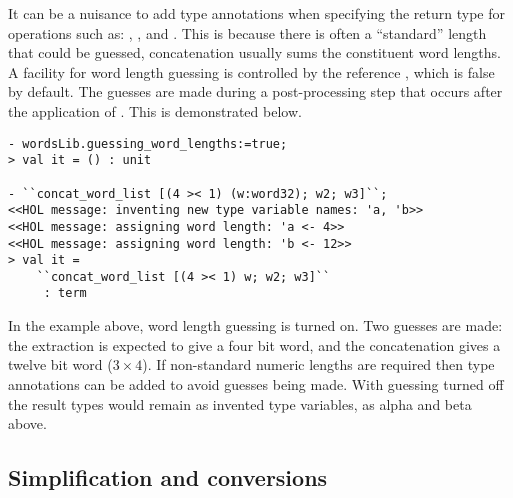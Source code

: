 It can be a nuisance to add type annotations when specifying the return type for operations such as: , ,  and .  This is because there is often a ``standard'' length that could be guessed, \eg{} concatenation usually sums the constituent word lengths.  A facility for word length guessing is controlled by the reference , which is false by default.  The guesses are made during a post-processing step that occurs after the application of .  This is demonstrated below.
\begin{session}
\begin{verbatim}
- wordsLib.guessing_word_lengths:=true;
> val it = () : unit

- ``concat_word_list [(4 >< 1) (w:word32); w2; w3]``;
<<HOL message: inventing new type variable names: 'a, 'b>>
<<HOL message: assigning word length: 'a <- 4>>
<<HOL message: assigning word length: 'b <- 12>>
> val it =
    ``concat_word_list [(4 >< 1) w; w2; w3]``
     : term
\end{verbatim}
\end{session}
In the example above, word length guessing is turned on.  Two guesses are made: the extraction is expected to give a four bit word, and the concatenation gives a twelve bit word ($3 \times 4$).  If non-standard numeric lengths are required then type annotations can be added to avoid guesses being made.  With guessing turned off the result types would remain as invented type variables, \ie{} as alpha and beta above.

\subsection{Simplification and conversions}

